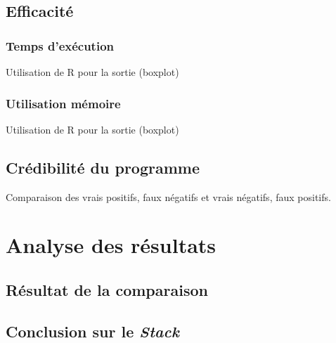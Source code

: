 	\subsection{Efficacité}

		\subsubsection{Temps d'exécution}

Utilisation de R pour la sortie (boxplot)


		\subsubsection{Utilisation mémoire}

Utilisation de R pour la sortie (boxplot)


	\subsection{Crédibilité du programme}

Comparaison des vrais positifs, faux négatifs et vrais négatifs, faux positifs.


\section{Analyse des résultats}

	\subsection{Résultat de la comparaison}


	\subsection{Conclusion sur le \emph{Stack}}
